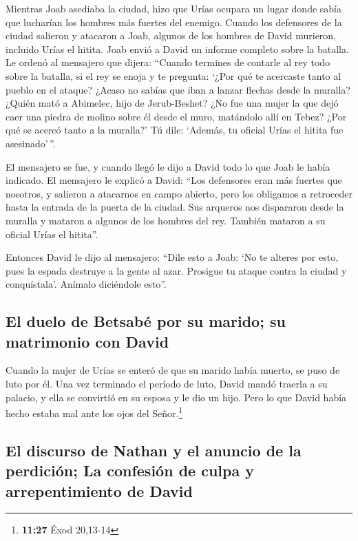  Mientras Joab asediaba la ciudad, hizo que Urías ocupara
un lugar donde sabía que lucharían los hombres más fuertes del enemigo.
 Cuando los defensores de la ciudad salieron y atacaron a
Joab, algunos de los hombres de David murieron, incluido Urías el
hitita.  Joab envió a David un informe completo sobre la
batalla.  Le ordenó al mensajero que dijera: ``Cuando
termines de contarle al rey todo sobre la batalla,  si el
rey se enoja y te pregunta: `¿Por qué te acercaste tanto al pueblo en el
ataque? ¿Acaso no sabías que iban a lanzar flechas desde la muralla?
 ¿Quién mató a Abimelec, hijo de Jerub-Beshet? ¿No fue
una mujer la que dejó caer una piedra de molino sobre él desde el muro,
matándolo allí en Tebez? ¿Por qué se acercó tanto a la muralla?' Tú
dile: `Además, tu oficial Urías el hitita fue asesinado'\,''.

 El mensajero se fue, y cuando llegó le dijo a David todo
lo que Joab le había indicado.  El mensajero le explicó a
David: ``Los defensores eran más fuertes que nosotros, y salieron a
atacarnos en campo abierto, pero los obligamos a retroceder hasta la
entrada de la puerta de la ciudad.  Sus arqueros nos
dispararon desde la muralla y mataron a algunos de los hombres del rey.
También mataron a su oficial Urías el hitita''.

 Entonces David le dijo al mensajero: ``Dile esto a Joab:
`No te alteres por esto, pues la espada destruye a la gente al azar.
Prosigue tu ataque contra la ciudad y conquístala'. Anímalo diciéndole
esto''.

\hypertarget{el-duelo-de-betsabuxe9-por-su-marido-su-matrimonio-con-david}{%
\subsection{El duelo de Betsabé por su marido; su matrimonio con
David}\label{el-duelo-de-betsabuxe9-por-su-marido-su-matrimonio-con-david}}

 Cuando la mujer de Urías se enteró de que su marido
había muerto, se puso de luto por él.  Una vez terminado
el período de luto, David mandó traerla a su palacio, y ella se
convirtió en su esposa y le dio un hijo. Pero lo que David había hecho
estaba mal ante los ojos del Señor.\footnote{\textbf{11:27} Éxod
  20,13-14}

\hypertarget{el-discurso-de-nathan-y-el-anuncio-de-la-perdiciuxf3n-la-confesiuxf3n-de-culpa-y-arrepentimiento-de-david}{%
\subsection{El discurso de Nathan y el anuncio de la perdición; La
confesión de culpa y arrepentimiento de
David}\label{el-discurso-de-nathan-y-el-anuncio-de-la-perdiciuxf3n-la-confesiuxf3n-de-culpa-y-arrepentimiento-de-david}}

